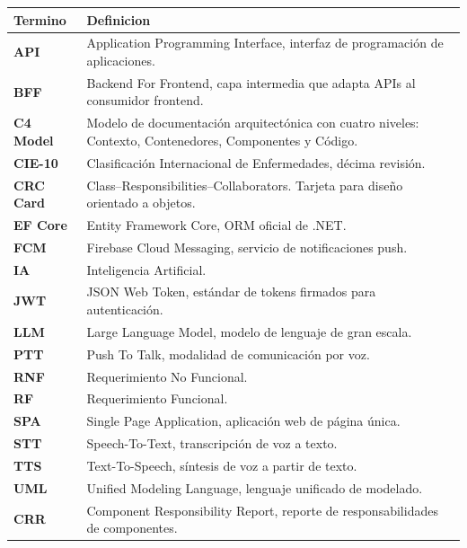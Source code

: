 \begin{longtable}{>{\bfseries\color{fmAccent}}L{2.5cm} L{12cm}}
  \toprule
  \textbf{\color{fmAccent}Termino} & \textbf{\color{fmAccent}Definicion} \\
  \midrule
  \endhead

  API & Application Programming Interface, interfaz de programación de aplicaciones. \\
  BFF & Backend For Frontend, capa intermedia que adapta APIs al consumidor frontend. \\
  C4 Model & Modelo de documentación arquitectónica con cuatro niveles: Contexto, Contenedores, Componentes y Código. \\
  CIE-10 & Clasificación Internacional de Enfermedades, décima revisión. \\
  CRC Card & Class--Responsibilities--Collaborators. Tarjeta para diseño orientado a objetos. \\
  EF Core & Entity Framework Core, ORM oficial de .NET. \\
  FCM & Firebase Cloud Messaging, servicio de notificaciones push. \\
  IA & Inteligencia Artificial. \\
  JWT & JSON Web Token, estándar de tokens firmados para autenticación. \\
  LLM & Large Language Model, modelo de lenguaje de gran escala. \\
  PTT & Push To Talk, modalidad de comunicación por voz. \\
  RNF & Requerimiento No Funcional. \\
  RF & Requerimiento Funcional. \\
  SPA & Single Page Application, aplicación web de página única. \\
  STT & Speech-To-Text, transcripción de voz a texto. \\
  TTS & Text-To-Speech, síntesis de voz a partir de texto. \\
  UML & Unified Modeling Language, lenguaje unificado de modelado. \\
  CRR & Component Responsibility Report, reporte de responsabilidades de componentes. \\
  \bottomrule
\end{longtable}
